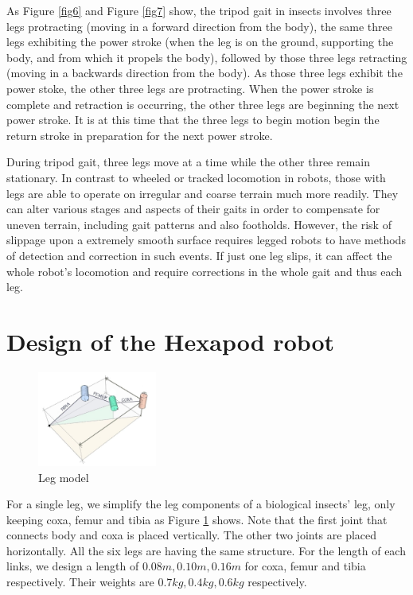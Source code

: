 \documentclass[conference]{IEEEtran}
\begin{document}
As Figure \ref{fig6} and Figure \ref{fig7} show, the tripod gait in insects involves three legs protracting (moving in a forward direction from the body), the same three legs exhibiting the power stroke (when the leg is on the ground, supporting the body, and from which it propels the body), followed by those three legs retracting (moving in a backwards direction from the body). As those three legs exhibit the power stoke, the other three legs are protracting. When the power stroke is complete and retraction is occurring, the other three legs are beginning the next power stroke. It is at this time that the three legs to begin motion begin the return stroke in preparation for the next power stroke.\cite{b4}

During tripod gait, three legs move at a time while the other three remain stationary. In contrast to wheeled or tracked locomotion in robots, those with legs are able to operate on irregular and coarse terrain much more readily. They can alter various stages and aspects of their gaits in order to compensate for uneven terrain, including gait patterns and also footholds. However, the risk of slippage upon a extremely smooth surface requires legged robots to have methods of detection and correction in such events. If just one leg slips, it can affect the whole robot’s locomotion and require corrections in the whole gait and thus each leg.\cite{b5}

\section{Design of the Hexapod robot}\label{s3}

\begin{figure}
    \centerline{\includegraphics[width=0.35\textwidth]{single_leg.jpg}}
    \caption{Leg model}
    \label{fig2}
\end{figure}

For a single leg, we simplify the leg components of a biological insects' leg, only keeping coxa, femur and tibia as Figure \ref{fig2} shows. Note that the first joint that connects body and coxa is placed vertically. The other two joints are placed horizontally. All the six legs are having the same structure. For the length of each links, we design a length of \(0.08m, 0.10m, 0.16m\) for coxa, femur and tibia respectively. Their weights are \(0.7kg, 0.4kg, 0.6kg\) respectively.
\end{document}

